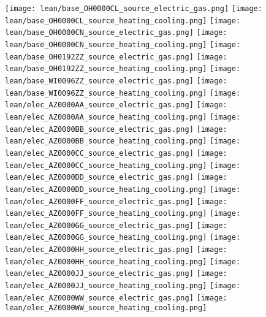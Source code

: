 \texttt{[image: lean/base\_OH0000CL\_source\_electric\_gas.png]}
\texttt{[image: lean/base\_OH0000CL\_source\_heating\_cooling.png]}
\texttt{[image: lean/base\_OH0000CN\_source\_electric\_gas.png]}
\texttt{[image: lean/base\_OH0000CN\_source\_heating\_cooling.png]}
\texttt{[image: lean/base\_OH0192ZZ\_source\_electric\_gas.png]}
\texttt{[image: lean/base\_OH0192ZZ\_source\_heating\_cooling.png]}
\texttt{[image: lean/base\_WI0096ZZ\_source\_electric\_gas.png]}
\texttt{[image: lean/base\_WI0096ZZ\_source\_heating\_cooling.png]}
\texttt{[image: lean/elec\_AZ0000AA\_source\_electric\_gas.png]}
\texttt{[image: lean/elec\_AZ0000AA\_source\_heating\_cooling.png]}
\texttt{[image: lean/elec\_AZ0000BB\_source\_electric\_gas.png]}
\texttt{[image: lean/elec\_AZ0000BB\_source\_heating\_cooling.png]}
\texttt{[image: lean/elec\_AZ0000CC\_source\_electric\_gas.png]}
\texttt{[image: lean/elec\_AZ0000CC\_source\_heating\_cooling.png]}
\texttt{[image: lean/elec\_AZ0000DD\_source\_electric\_gas.png]}
\texttt{[image: lean/elec\_AZ0000DD\_source\_heating\_cooling.png]}
\texttt{[image: lean/elec\_AZ0000FF\_source\_electric\_gas.png]}
\texttt{[image: lean/elec\_AZ0000FF\_source\_heating\_cooling.png]}
\texttt{[image: lean/elec\_AZ0000GG\_source\_electric\_gas.png]}
\texttt{[image: lean/elec\_AZ0000GG\_source\_heating\_cooling.png]}
\texttt{[image: lean/elec\_AZ0000HH\_source\_electric\_gas.png]}
\texttt{[image: lean/elec\_AZ0000HH\_source\_heating\_cooling.png]}
\texttt{[image: lean/elec\_AZ0000JJ\_source\_electric\_gas.png]}
\texttt{[image: lean/elec\_AZ0000JJ\_source\_heating\_cooling.png]}
\texttt{[image: lean/elec\_AZ0000WW\_source\_electric\_gas.png]}
\texttt{[image: lean/elec\_AZ0000WW\_source\_heating\_cooling.png]}
